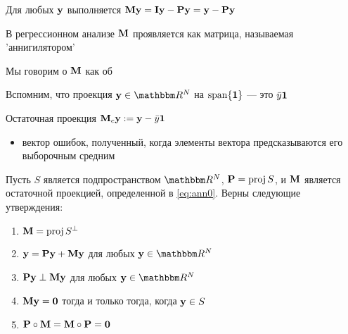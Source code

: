 \begin{frame}

     \vspace{2em}
    Для любых ${\mathbf y}$ выполняется 
    $\mathbf M {\mathbf y} = \mathbf I {\mathbf y} - \mathbf P {\mathbf y} = {\mathbf y} - \mathbf P {\mathbf y}$
    
    \vspace{.7em}
    В регрессионном анализе $\mathbf M$ проявляется как матрица, называемая 'аннигилятором'
    
    \vspace{.7em}
    Мы говорим о $\mathbf M$ как об 
    
\end{frame}

\begin{frame}

     \vspace{2em}
    \Eg
    Вспомним, что проекция
    $\boldy \in \RR^N$ на $\operatorname{span}\{{\mathbf 1}\}$ --- это
    $\bar y {\mathbf 1}$
    
    Остаточная проекция $\mathbf M_c {\mathbf y} := {\mathbf y} -
    \bar y {\mathbf 1}$
    \begin{itemize}
        \item  вектор ошибок, полученный, когда элементы вектора предсказываются 
        его выборочным средним
    \end{itemize}
    
    
\end{frame}

\begin{frame}

    \vspace{2em}
    \Fact{\eqref{ET-fa:opt3}}
    Пусть $S$ является подпространством $\RR^N$, $\mathbf P = \operatorname{proj} S$, и 
    $\mathbf M$ является остаточной проекцией, определенной в \eqref{eq:ann0}.  
    Верны следующие утверждения:
    \begin{enumerate}
        \item $\mathbf M = \operatorname{proj} S^{\perp}$
        \item ${\mathbf y} = \mathbf P {\mathbf y} + \mathbf M {\mathbf y}$ для любых $\boldy \in
            \RR^N$
        \item $\mathbf P {\mathbf y} \perp \mathbf M {\mathbf y}$ для любых $\boldy \in \RR^N$
        \item $\mathbf M {\mathbf y} = {\mathbf 0}$ тогда и только тогда, когда ${\mathbf y} \in S$
        \item $\mathbf P \circ \mathbf M = \mathbf M \circ \mathbf P = {\mathbf 0}$
    \end{enumerate}
\end{frame}

